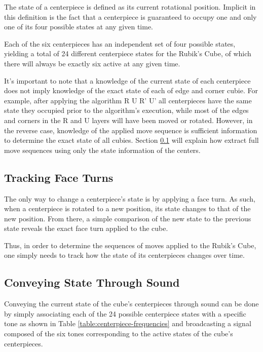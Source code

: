 The state of a centerpiece is defined as its current rotational
position. Implicit in this definition is the fact that a centerpiece is
guaranteed to occupy one and only one of its four possible states at
any given time.

Each of the six centerpieces has an independent set of four possible
states, yielding a total of 24 different centerpiece states for the
Rubik's Cube, of which there will always be exactly six active at any
given time.

It's important to note that a knowledge of the current state of each
centerpiece does not imply knowledge of the exact state of each of edge
and corner cubie. For example, after applying the algorithm R U R' U'
all centerpieces have the same state they occupied prior to the
algorithm's execution, while most of the edges and corners in the R and
U layers will have been moved or rotated. However, in the reverse case,
knowledge of the applied move sequence is sufficient information to
determine the exact state of all cubies. Section
\ref{subsec:tracking-face-turns} will explain how extract full move
sequences using only the state information of the centers.

\subsection{Tracking Face Turns}
\label{subsec:tracking-face-turns}

The only way to change a centerpiece's state is by applying a face
turn. As such, when a centerpiece is rotated to a new position, its
state changes to that of the new position. From there, a simple
comparison of the new state to the previous state reveals the exact
face turn applied to the cube.

Thus, in order to determine the sequences of moves applied to the
Rubik's Cube, one simply needs to track how the state of its
centerpieces changes over time.

\subsection{Conveying State Through Sound}
\label{subsec:conveying-state-through-sound}

Conveying the current state of the cube's centerpieces through sound
can be done by simply associating each of the 24 possible centerpiece
states with a specific tone as shown in Table
\ref{table:centerpiece-frequencies} and broadcasting a signal composed
of the six tones corresponding to the active states of the cube's
centerpieces.

